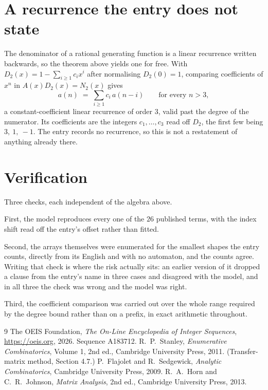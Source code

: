 \documentclass[11pt,a4paper]{article}
\theoremstyle{plain}
\theoremstyle{definition}
\begin{document}
\section{A recurrence the entry does not state}

The denominator of a rational generating function is a linear recurrence written backwards, so
the theorem above yields one for free. With $D_2(x)=1-\sum_{i\ge1}c_ix^i$ after normalising
$D_2(0)=1$, comparing coefficients of $x^n$ in $A(x)D_2(x)=N_2(x)$ gives
\[
a(n)\;=\;\sum_{i\ge1}c_i\,a(n-i)\qquad\text{for every }n>3,
\]
a constant-coefficient linear recurrence of order $3$, valid past the degree of the
numerator. Its coefficients are the integers $c_1,\dots,c_{3}$ read off $D_2$, the first few being $3,\ 1,\ -1$. The entry records no recurrence, so this is not a restatement of anything
already there.

\section{Verification}

Three checks, each independent of the algebra above.

First, the model reproduces every one of the $26$ published terms, with the index shift
read off the entry's offset rather than fitted.

Second, the arrays themselves were enumerated for the smallest shapes the entry counts,
directly from its English and with no automaton, and the counts agree. Writing that check is
where the risk actually sits: an earlier version of it dropped a clause from the entry's name
in three cases and disagreed with the model, and in all three the check was wrong and the model
was right.

Third, the coefficient comparison was carried out over the whole range required by the degree
bound rather than on a prefix, in exact arithmetic throughout.

\begin{thebibliography}{9}
 The OEIS Foundation, \emph{The On-Line Encyclopedia of Integer
Sequences}, \url{https://oeis.org}, 2026. Sequence A183712.
 R.~P.~Stanley, \emph{Enumerative Combinatorics}, Volume 1, 2nd ed.,
Cambridge University Press, 2011. (Transfer-matrix method, Section 4.7.)
 P.~Flajolet and R.~Sedgewick, \emph{Analytic Combinatorics}, Cambridge
University Press, 2009.
 R.~A.~Horn and C.~R.~Johnson, \emph{Matrix Analysis}, 2nd ed., Cambridge
University Press, 2013.
\end{thebibliography}
\end{document}
